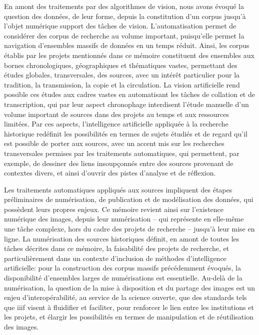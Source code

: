 \documentclass[a4paper,12pt,twoside]{book}
\newcommand{\ia}{intelligence artificielle\xspace}
\newcommand{\iiif}{\gls{iiif}\xspace}
\begin{document}
	En amont des traitements par des algorithmes de vision, nous avons évoqué la question des données, de leur forme, depuis la constitution d'un corpus jusqu'à l'objet numérique support des tâches de vision. L'automatisation permet de considérer des corpus de recherche au volume important, puisqu'elle permet la navigation d'ensembles massifs de données en un temps réduit. Ainsi, les corpus établis par les projets mentionnés dans ce mémoire constituent des ensembles aux bornes chronologiques, géographiques et thématiques vastes, permettant des études globales, transversales, des sources, avec un intérêt particulier pour la tradition, la transmission, la copie et la circulation. La vision artificielle rend possible ces études aux cadres vastes en automatisant les tâches de collation et de transcription, qui par leur aspect chronophage interdisent l'étude manuelle d'un volume important de sources dans des projets au temps et aux ressources limitées. Par ces aspects, l'\ia appliquée à la recherche historique redéfinit les possibilités en termes de sujets étudiés et de regard qu'il est possible de porter aux sources, avec un accent mis sur les recherches transversales permises par les traitements automatiques, qui permettent, par exemple, de dessiner des liens insoupçonnés entre des sources provenant de contextes divers, et ainsi d'ouvrir des pistes d'analyse et de réflexion.
	
	Les traitements automatiques appliqués aux sources impliquent des étapes préliminaires de numérisation, de publication et de modélisation des données, qui possèdent leurs propres enjeux. Ce mémoire revient ainsi sur l'existence numérique des images, depuis leur numérisation -- qui représente en elle-même une tâche complexe, hors du cadre des projets de recherche -- jusqu'à leur mise en ligne. La numérisation des sources historiques définit, en amont de toutes les tâches décrites dans ce mémoire, la faisabilité des projets de recherche, et particulièrement dans un contexte d'inclusion de méthodes d'\ia : pour la construction des corpus massifs précédemment évoqués, la disponibilité d'ensembles larges de numérisations est essentielle. Au-delà de la numérisation, la question de la mise à disposition et du partage des images est un enjeu d'interopérabilité, au service de la science ouverte, que des standards tels que \iiif visent à fluidifier et faciliter, pour renforcer le lien entre les institutions et les projets, et élargir les possibilités en termes de manipulation et de réutilisation des images.
	\\
	
\end{document}
